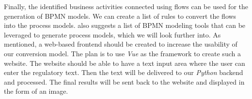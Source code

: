 Finally, the identified business activities connected using flows can be used for the generation of BPMN models. We can create a list of rules to convert the flows into the process models. \cite{literature_review_1} also suggests a list of BPMN modeling tools that can be leveraged to generate process models, which we will look further into. As mentioned, a web-based frontend should be created to increase the usability of our conversion model. The plan is to use \textit{Vue} as the framework to create such a website. The website should be able to have a text input area where the user can enter the regulatory text. Then the text will be delivered to our \textit{Python} backend and processed. The final results will be sent back to the website and displayed in the form of an image. 